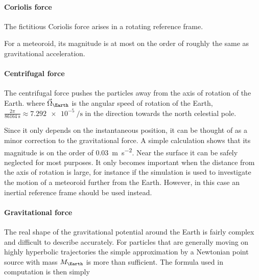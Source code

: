             \paragraph{Coriolis force} \label{saiC}
                The fictitious Coriolis force arises in a rotating reference frame.

                For a meteoroid, its magnitude is at most on the order of
                roughly the same as gravitational acceleration.

            \paragraph{Centrifugal force} \label{saic}
                The centrifugal force pushes the particles away from the axis of rotation of the Earth.
                where $\vec{\Omega}_\Earth$ is the angular speed of rotation of the Earth,
                $\frac{2\pi}{\SI{86164}{\second}} \approx \SI{7.292e-5}{\per\second}$ in the direction
                towards the north celestial pole.

                Since it only depends on the instantaneous position, it can be thought of as a minor correction to the
                gravitational force. A simple calculation shows that its magnitude is on the order
                of \SI{0.03}{\metre\per\second\squared}. Near the surface it can be safely neglected for most purposes.
                It only becomes important when the distance from the axis of rotation is large, for instance if the simulation
                is used to investigate the motion of a meteoroid further from the Earth.
                However, in this case an inertial reference frame should be used instead.

            \paragraph{Gravitational force} \label{saig}
                The real shape of the gravitational potential around the Earth is fairly complex and difficult to describe accurately.
                For particles that are generally moving on highly hyperbolic trajectories the
                simple approximation by a Newtonian point source with mass $M_\Earth$ is more than sufficient.
                The formula used in computation is then simply

